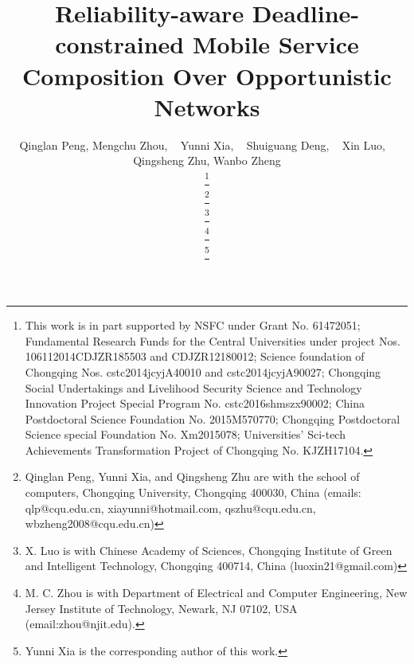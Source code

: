 \documentclass[journal]{IEEEtran}
\begin{document}
\title{Reliability-aware Deadline-constrained Mobile Service Composition Over Opportunistic Networks}

\author{Qinglan Peng,
        Mengchu Zhou, ~
        Yunni Xia, ~
        Shuiguang Deng, ~
        Xin Luo, ~
        Qingsheng Zhu,
        Wanbo Zheng


\thanks{This work is in part supported by NSFC under Grant No. 61472051; Fundamental Research Funds for the Central Universities under project Nos. 106112014CDJZR185503 and CDJZR12180012; Science foundation of
Chongqing Nos. cstc2014jcyjA40010 and cstc2014jcyjA90027; Chongqing Social Undertakings and Livelihood Security Science and Technology Innovation Project Special Program No. cstc2016shmszx90002; China Postdoctoral Science Foundation No. 2015M570770; Chongqing Postdoctoral Science special Foundation No. Xm2015078; Universities’ Sci-tech Achievements Transformation Project of Chongqing No. KJZH17104.}

\thanks{Qinglan Peng, Yunni Xia, and Qingsheng Zhu are with the school of computers, Chongqing University, Chongqing 400030, China (emails: qlp@cqu.edu.cn, xiayunni@hotmail.com, qszhu@cqu.edu.cn, wbzheng2008@cqu.edu.cn)}

\thanks{X. Luo is with Chinese Academy of Sciences, Chongqing Institute of Green and Intelligent
Technology, Chongqing 400714, China (luoxin21@gmail.com)}

\thanks{M. C. Zhou is with Department of Electrical and Computer Engineering, New Jersey Institute of Technology, Newark, NJ 07102, USA (email:zhou@njit.edu).}

\thanks{Yunni Xia is the corresponding author of this work.}
}




\maketitle
\end{document}
